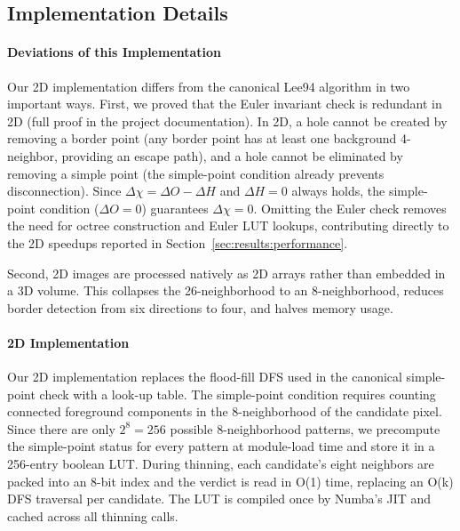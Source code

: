 \documentclass[11pt]{article}
\begin{document}
\subsection{Implementation Details}\label{sec:methods:impl}

\paragraph{Deviations of this Implementation}\label{sec:methods:impl:deviations}

Our 2D implementation differs from the canonical Lee94 algorithm in
two important ways. First, we proved that the Euler invariant check
is redundant in 2D (full proof in the project documentation). In 2D,
a hole cannot be created by removing a border point (any border point
has at least one background 4-neighbor, providing an escape path), and
a hole cannot be eliminated by removing a simple point (the
simple-point condition already prevents disconnection). Since
$\Delta\chi = \Delta O - \Delta H$ and $\Delta H = 0$ always holds,
the simple-point condition ($\Delta O = 0$) guarantees $\Delta\chi =
0$. Omitting the Euler check removes the need for octree construction
and Euler LUT lookups, contributing directly to the 2D speedups
reported in Section~\ref{sec:results:performance}.

Second, 2D images are processed natively as 2D arrays rather than
embedded in a 3D volume. This collapses the 26-neighborhood to an
8-neighborhood, reduces border detection from six directions to four,
and halves memory usage.

\paragraph{2D Implementation}\label{sec:methods:impl:2d}

Our 2D implementation replaces the flood-fill DFS used in the
canonical simple-point check with a look-up table. The simple-point
condition requires counting connected foreground components in the
8-neighborhood of the candidate pixel. Since there are only $2^8 =
256$ possible 8-neighborhood patterns, we precompute the simple-point
status for every pattern at module-load time and store it in a
256-entry boolean LUT. During thinning, each candidate's eight
neighbors are packed into an 8-bit index and the verdict is read in
O(1) time, replacing an O(k) DFS traversal per candidate. The LUT is
compiled once by Numba's JIT and cached across all thinning calls.
\end{document}
